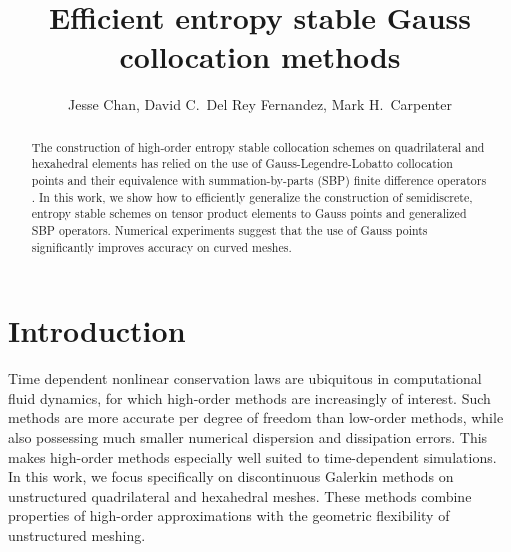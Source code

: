 \documentclass[review,onefignum,onetabnum,final]{siamart171218}
\author{Jesse Chan, David C.\ Del Rey Fernandez, Mark H.\ Carpenter}
\title{Efficient entropy stable Gauss collocation methods}
\begin{document}
\maketitle

\begin{abstract}
The construction of high-order entropy stable collocation schemes on quadrilateral and hexahedral elements has relied on the use of Gauss-Legendre-Lobatto collocation points \cite{fisher2013high, carpenter2014entropy, gassner2016split} and their equivalence with summation-by-parts (SBP) finite difference operators \cite{gassner2013skew}.  In this work, we show how to efficiently generalize the construction of semidiscrete, entropy stable schemes on tensor product elements to Gauss points and generalized SBP operators.  Numerical experiments suggest that the use of Gauss points significantly improves accuracy on curved meshes.  
\end{abstract}

\section{Introduction}

Time dependent nonlinear conservation laws are ubiquitous in computational fluid dynamics, for which high-order methods are increasingly of interest.  Such methods are more accurate per degree of freedom than low-order methods, while also possessing much smaller numerical dispersion and dissipation errors.  This makes high-order methods especially well suited to time-dependent simulations.  In this work, we focus specifically on discontinuous Galerkin methods on unstructured quadrilateral and hexahedral meshes.  These methods combine properties of high-order approximations with the geometric flexibility of unstructured meshing.  %
\end{document}
